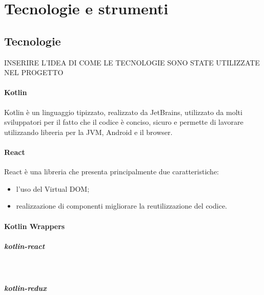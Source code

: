 
\chapter{Tecnologie e strumenti}
\label{cap:tecnologie-strumenti}


\section{Tecnologie}
\label{sec:tecnologie}
INSERIRE L'IDEA DI COME LE TECNOLOGIE SONO STATE UTILIZZATE NEL PROGETTO

\subsubsection*{Kotlin}
Kotlin è un linguaggio tipizzato, realizzato da JetBrains, utilizzato da molti sviluppatori per il fatto che il codice è conciso, sicuro e permette di lavorare utilizzando libreria per la JVM, Android e il browser.

\subsubsection*{React}
React è una libreria che presenta principalmente due caratteristiche:
\begin{itemize}
	\item l'uso del Virtual DOM;
	\item realizzazione di componenti migliorare la reutilizzazione del codice.
\end{itemize}

\subsubsection*{Kotlin Wrappers}
\paragraph{kotlin-react} \mbox{} \\
\paragraph{kotlin-redux} \mbox{} \\
